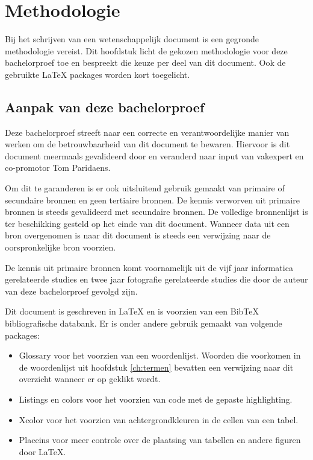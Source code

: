 
\chapter{Methodologie}
\label{ch:methodologie}

Bij het schrijven van een wetenschappelijk document is een gegronde methodologie vereist. Dit hoofdstuk licht de gekozen methodologie voor deze bachelorproef toe en bespreekt die keuze per deel van dit document. Ook de gebruikte \LaTeX{} packages worden kort toegelicht.

\section{Aanpak van deze bachelorproef}
\label{sec:aanpak-bachelorproef}

Deze bachelorproef streeft naar een correcte en verantwoordelijke manier van werken om de betrouwbaarheid van dit document te bewaren. Hiervoor is dit document meermaals gevalideerd door en veranderd naar input van vakexpert en co-promotor Tom Paridaens. 

Om dit te garanderen is er ook uitsluitend gebruik gemaakt van primaire of secundaire bronnen en geen tertiaire bronnen. De kennis verworven uit primaire bronnen is steeds gevalideerd met secundaire bronnen. De volledige bronnenlijst is ter beschikking gesteld op het einde van dit document. Wanneer data uit een bron overgenomen is naar dit document is steeds een verwijzing naar de oorspronkelijke bron voorzien. 

De kennis uit primaire bronnen komt voornamelijk uit de vijf jaar informatica gerelateerde studies en twee jaar fotografie gerelateerde studies die door de auteur van deze bachelorproef gevolgd zijn.

Dit document is geschreven in \LaTeX{} en is voorzien van een BibTeX bibliografische databank. Er is onder andere gebruik gemaakt van volgende packages: 

\begin{itemize}
	
	\item Glossary voor het voorzien van een woordenlijst. Woorden die voorkomen in de woordenlijst uit hoofdstuk \ref{ch:termen} bevatten een verwijzing naar dit overzicht wanneer er op geklikt wordt.
	
	\item Listings en colors voor het voorzien van code met de gepaste highlighting. 
	
	\item Xcolor voor het voorzien van achtergrondkleuren in de cellen van een tabel.
	
	\item Placeins voor meer controle over de plaatsing van tabellen en andere figuren door \LaTeX{}.
	
\end{itemize}


